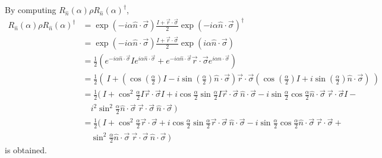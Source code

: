 By computing $R_{\hat n}(\alpha) \rho R_{\hat n}(\alpha)^\dagger$,
\begin{align}
    R_{\hat n}(\alpha) \rho R_{\hat n}(\alpha)^\dagger &= 
        \exp(-i \alpha \hat{n}\cdot\vec\sigma)
        \frac{I + \vec r \cdot \vec{\sigma}}{2}
        \exp(-i \alpha \hat{n}\cdot\vec\sigma)^\dagger \\
    &= \exp(-i \alpha \hat{n}\cdot\vec\sigma)
        \frac{I + \vec r \cdot \vec{\sigma}}{2}
        \exp(i \alpha \hat{n}\cdot\vec\sigma) \\
    &= \frac{1}{2} \left(
        e^{-i \alpha \hat{n}\cdot\vec\sigma}I
        e^{i \alpha \hat{n}\cdot\vec\sigma}
        +
        e^{-i \alpha \hat{n}\cdot\vec\sigma}
        \vec{r} \cdot \vec{\sigma}
        e^{i \alpha \hat{n}\cdot\vec\sigma}
    \right) \\
    &= \frac{1}{2} \left(
        \ I + \left(
            \cos \left( \frac{\alpha}{2} \right) I -
            i \sin \left( \frac{\alpha}{2}\right)
            \hat{n} \cdot \vec{\sigma}
        \right)
        \vec{r}\cdot\vec{\sigma}
        \left(
            \cos \left( \frac{\alpha}{2} \right) I +
            i \sin \left( \frac{\alpha}{2} \right)
            \hat{n} \cdot \vec{\sigma}
        \right)
    \ \right) \\
    &= \frac{1}{2} (\ 
        I + \cos^2 \frac{\alpha}{2} I \vec{r}\cdot\vec{\sigma}I +
        i \cos\frac{\alpha}{2}\sin\frac{\alpha}{2} I \vec{r} \cdot\vec{\sigma}
            \ \hat{n}\cdot\vec{\sigma} -
        i \sin\frac{\alpha}{2}\cos\frac{\alpha}{2} \hat{n}\cdot\vec{\sigma}
            \ \vec{r}\cdot\vec{\sigma} I -  \nonumber \\
        &\quad i^2 \sin^2\frac{\alpha}{2} \hat{n}\cdot\vec{\sigma}\ 
            \vec{r}\cdot\vec{\sigma}\ \hat{n}\cdot\vec{\sigma}
    \ )
    \\
    &= \frac{1}{2} (\ 
        I + \cos^2 \frac{\alpha}{2} \vec{r}\cdot\vec{\sigma} +
        i \cos\frac{\alpha}{2}\sin\frac{\alpha}{2} \vec{r} \cdot\vec{\sigma}
            \ \hat{n}\cdot\vec{\sigma} -
        i \sin\frac{\alpha}{2}\cos\frac{\alpha}{2} \hat{n}\cdot\vec{\sigma}
            \ \vec{r}\cdot\vec{\sigma} +  \nonumber \\
        &\quad \sin^2\frac{\alpha}{2} \hat{n}\cdot\vec{\sigma}\ 
            \vec{r}\cdot\vec{\sigma}\ \hat{n}\cdot\vec{\sigma}
    \ )
    \label{eq:nielsen-and-chuang-exercise-4-6-split}
\end{align}
is obtained.

